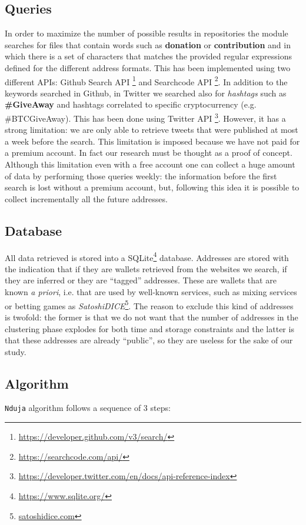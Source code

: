 \subsection{Queries}
\label{sec:queries}
In order to maximize the number of possible results in repositories the module
\walletcollector{} searches for files that contain words such as
\textbf{donation} or \textbf{contribution} and in which there is a set of
characters that matches the provided regular expressions defined for the
different address formats. This has been implemented using two different APIs:
Github Search API \footnote{\url{https://developer.github.com/v3/search/}} and
Searchcode API \footnote{\url{https://searchcode.com/api/}}.
In addition to the keywords searched in Github, in Twitter we searched also for
\textit{hashtags} such as \textbf{\#GiveAway} and
hashtags correlated to specific cryptocurrency (e.g. \#BTCGiveAway). This has
been done using Twitter API
\footnote{\url{https://developer.twitter.com/en/docs/api-reference-index}}.
However, it has a strong limitation: we are only able to retrieve tweets that
were published at most a week before the search. This limitation is imposed
because we have not paid for a premium account. In fact our research must be
thought as a proof of concept.
Although this limitation even with a free account one can collect a huge amount
of data by performing those queries weekly:
the information before the first search is lost without a premium account, but,
following this idea it is possible to collect incrementally all the future
addresses.

\subsection{Database}
All data retrieved is stored into a
SQLite\footnote{\url{https://www.sqlite.org/}} database. Addresses are stored
with the indication that if they are wallets retrieved from the websites we
search, if they are inferred or they are ``tagged'' addresses. These are
wallets that are known \emph{a priori}, i.e. that are used by well-known
services, such as mixing services or betting games as
\textit{SatoshiDICE}\footnote{\url{satoshidice.com}}.
The reason to exclude this kind of addresses is twofold: the former is that we
do not want that the number of addresses in the clustering phase explodes for
both time and storage constraints and the latter is that these
addresses are already ``public'', so they are useless for the sake of our study.

\subsection{Algorithm}
\texttt{Nduja} algorithm follows a sequence of 3 steps:
